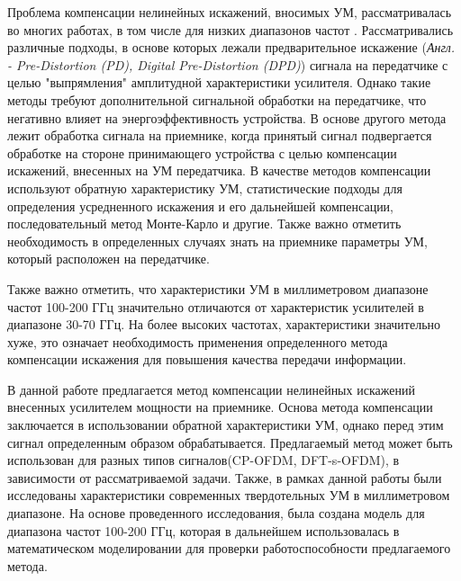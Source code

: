 Проблема компенсации нелинейных искажений, вносимых УМ, рассматривалась во
многих работах, в том числе для низких диапазонов частот
\cite[]{sharath2015,shabany2008,eda2001,maltsev2021,bhat2016,qi2010,gregorio2007}.
Рассматривались различные подходы, в основе которых лежали предварительное
искажение (\textit{Англ. - Pre-Distortion (PD), Digital Pre-Distortion
(DPD)}) сигнала на передатчике с целью "выпрямления" амплитудной
характеристики усилителя. Однако такие методы требуют дополнительной
сигнальной обработки на передатчике, что негативно влияет на
энергоэффективность устройства. В основе другого метода лежит обработка
сигнала на приемнике, когда принятый сигнал подвергается обработке на
стороне принимающего устройства с целью компенсации искажений, внесенных на
УМ передатчика. В качестве методов компенсации используют обратную
характеристику УМ, статистические подходы для определения усредненного
искажения и его дальнейшей компенсации, последовательный метод Монте-Карло
и другие. Также важно отметить необходимость в определенных случаях знать
на приемнике параметры УМ, который расположен на передатчике.

Также важно отметить, что характеристики УМ в миллиметровом диапазоне
частот 100-200 ГГц значительно отличаются от характеристик усилителей в
диапазоне 30-70 ГГц. На более высоких частотах, характеристики значительно
хуже, это означает необходимость применения определенного метода
компенсации искажения для повышения качества передачи информации.

В данной работе предлагается метод компенсации нелинейных искажений
внесенных усилителем мощности на приемнике. Основа метода компенсации
заключается в использовании обратной характеристики УМ, однако перед этим
сигнал определенным образом обрабатывается. Предлагаемый метод может быть
использован для разных типов сигналов(CP-OFDM, DFT-s-OFDM),
в зависимости от рассматриваемой задачи. Также, в рамках данной работы были
исследованы характеристики современных твердотельных УМ в миллиметровом диапазоне. На
основе проведенного исследования, была создана модель для диапазона
частот 100-200 ГГц, которая в дальнейшем использовалась в математическом
моделировании для проверки работоспособности предлагаемого метода.





